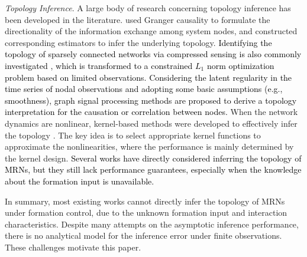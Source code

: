 \documentclass[12pt,journal,draftclsnofoot,onecolumn]{IEEEtran}
\begin{document}
\textit{Topology Inference}. 
A large body of research concerning topology inference has been developed in the literature. 
\cite{granger1969investigating,brovelli2004beta} used Granger causality to formulate the directionality of the information exchange among system nodes, and constructed corresponding estimators to infer the underlying topology. 
\textcolor{black}{
Identifying the topology of sparsely connected networks via compressed sensing is also commonly investigated \cite{timme2007revealing,wang2011network,hayden2016sparse,wai2019joint}, which is transformed to a constrained $L_1$ norm optimization problem based on limited observations. 
Considering the latent regularity in the time series of nodal observations and adopting some basic assumptions (e.g., smoothness), graph signal processing methods \cite{mei2015signal,onuki2016graph,egilmez2017graph,hallac2017network,pasdeloup2018characterization} are proposed to derive a topology interpretation for the causation or correlation between nodes. 
}
When the network dynamics are nonlinear, kernel-based methods were developed to effectively infer the topology \cite{karanikolas2016multi,karanikolas2017multi,wang2018inferring}. 
The key idea is to select appropriate kernel functions to approximate the nonlinearities, where the performance is mainly determined by the kernel design. 
\textcolor{black}{Several works \cite{vasquez2018network,8985069} have directly considered inferring the topology of MRNs, but they still lack performance guarantees, especially when the knowledge about the formation input is unavailable. }


In summary, most existing works cannot directly infer the topology of MRNs under formation control, due to the unknown formation input and interaction characteristics. 
Despite many attempts on the asymptotic inference performance, there is no analytical model for the inference error under finite observations. 
These challenges motivate this paper.  
\end{document}
